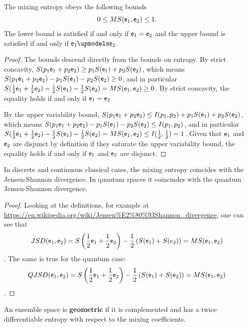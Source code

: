\begin{coro}
	The mixing entropy obeys the following bounds
	$$ 0 \leq MS(\mathsf{e}_1, \mathsf{e}_2) \leq 1.$$
	The lower bound is satisfied if and only if $\mathsf{e}_1 = \mathsf{e}_2$ and the upper bound is satisfied if and only if $\ens_1 \disjunct \ens_2$.
\end{coro}

\begin{proof}
	The bounds descend directly from the bounds on entropy. By strict concavity, $S(p_1\mathsf{e}_1 + p_2 \mathsf{e}_2) \geq p_1 S(\mathsf{e}_1) + p_2 S(\mathsf{e}_2)$, which means $S(p_1\mathsf{e}_1 + p_2 \mathsf{e}_2) - p_1 S(\mathsf{e}_1) - p_2 S(\mathsf{e}_2) \geq 0$, and in particular $S(\frac{1}{2} \mathsf{e}_1 + \frac{1}{2} \mathsf{e}_2) - \frac{1}{2} S(\mathsf{e}_1) - \frac{1}{2} S(\mathsf{e}_2) = MS(\mathsf{e}_1, \mathsf{e}_2) \geq 0$. By strict concavity, the equality holds if and only if $\mathsf{e}_1 = \mathsf{e}_2$
	
	By the upper variability bound, $S(p_1\mathsf{e}_1 + p_2 \mathsf{e}_2) \leq I(p_1, p_2) + p_1 S(\mathsf{e}_1) + p_2 S(\mathsf{e}_2)$, which means $S(p_1\mathsf{e}_1 + p_2 \mathsf{e}_2) - p_1 S(\mathsf{e}_1) - p_2 S(\mathsf{e}_2) \leq I(p_1, p_2)$, and in particular $S(\frac{1}{2} \mathsf{e}_1 + \frac{1}{2} \mathsf{e}_2) - \frac{1}{2} S(\mathsf{e}_1) - \frac{1}{2} S(\mathsf{e}_2) = MS(\mathsf{e}_1, \mathsf{e}_2) \leq I(\frac{1}{2}, \frac{1}{2}) = 1$. Given that $\mathsf{e}_1$ and $\mathsf{e}_2$ are disjunct by definition if they saturate the upper variability bound, the equality holds if and only if $\mathsf{e}_1$ and $\mathsf{e}_2$ are disjunct.
\end{proof}

\begin{prop}
	In discrete and continuous classical cases, the mixing entropy coincides with the Jensen-Shannon divergence. In quantum spaces it coincindes with the quantum Jensen-Shannon divergence.
\end{prop}

\begin{proof}
	Looking at the definitions, for example at \url{https://en.wikipedia.org/wiki/Jensen%E2%80%93Shannon_divergence}, one can see that
	$$ JSD(\mathsf{e}_1, \mathsf{e}_2) = S\left(\frac{1}{2}\mathsf{e}_1 + \frac{1}{2}\mathsf{e}_2 \right)  - \frac{1}{2} \left(S(\mathsf{e}_1) + S(e_2)\right) = MS(\mathsf{e}_1, \mathsf{e}_2)$$.
	The same is true for the quantum case:
	$$ QJSD(\mathsf{e}_1, \mathsf{e}_2) = S\left(\frac{1}{2}\mathsf{e}_1 + \frac{1}{2}\mathsf{e}_2 \right)  - \frac{1}{2} \left(S(\mathsf{e}_1) + S(\mathsf{e}_2)\right) = MS(\mathsf{e}_1, \mathsf{e}_2)$$.
\end{proof}

\begin{defn}
	An ensemble space is \textbf{geometric} if it is complemented and has a twice differentiable entropy with respect to the mixing coefficients.
\end{defn}

